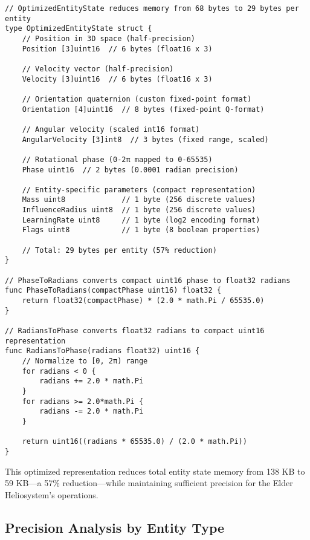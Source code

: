 \begin{tcolorbox}[colback=CodeBackground, colframe=DarkGray, title=Optimized EntityState Implementation in Go, fonttitle=\bfseries]
\begin{verbatim}
// OptimizedEntityState reduces memory from 68 bytes to 29 bytes per entity
type OptimizedEntityState struct {
    // Position in 3D space (half-precision)
    Position [3]uint16  // 6 bytes (float16 x 3)
    
    // Velocity vector (half-precision)
    Velocity [3]uint16  // 6 bytes (float16 x 3)
    
    // Orientation quaternion (custom fixed-point format)
    Orientation [4]uint16  // 8 bytes (fixed-point Q-format)
    
    // Angular velocity (scaled int16 format)
    AngularVelocity [3]int8  // 3 bytes (fixed range, scaled)
    
    // Rotational phase (0-2π mapped to 0-65535)
    Phase uint16  // 2 bytes (0.0001 radian precision)
    
    // Entity-specific parameters (compact representation)
    Mass uint8             // 1 byte (256 discrete values)
    InfluenceRadius uint8  // 1 byte (256 discrete values) 
    LearningRate uint8     // 1 byte (log2 encoding format)
    Flags uint8            // 1 byte (8 boolean properties)
    
    // Total: 29 bytes per entity (57% reduction)
}

// PhaseToRadians converts compact uint16 phase to float32 radians
func PhaseToRadians(compactPhase uint16) float32 {
    return float32(compactPhase) * (2.0 * math.Pi / 65535.0)
}

// RadiansToPhase converts float32 radians to compact uint16 representation
func RadiansToPhase(radians float32) uint16 {
    // Normalize to [0, 2π) range
    for radians < 0 {
        radians += 2.0 * math.Pi
    }
    for radians >= 2.0*math.Pi {
        radians -= 2.0 * math.Pi
    }
    
    return uint16((radians * 65535.0) / (2.0 * math.Pi))
}
\end{verbatim}
\end{tcolorbox}

This optimized representation reduces total entity state memory from 138 KB to 59 KB—a 57\% reduction—while maintaining sufficient precision for the Elder Heliosystem's operations.

\subsection{Precision Analysis by Entity Type}

